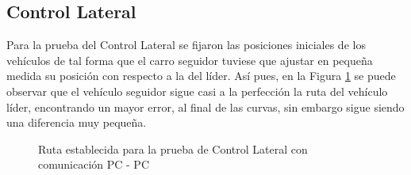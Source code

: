 \subsection{Control Lateral}
Para la prueba del Control Lateral se fijaron las posiciones iniciales de los vehículos de tal forma que el carro seguidor tuviese que ajustar en pequeña medida su posición con respecto a la del líder. Así pues, en la Figura \ref{fig:rutacl} se puede observar que el vehículo seguidor sigue casi a la perfección la ruta del vehículo líder, encontrando un mayor error, al final de las curvas, sin embargo sigue siendo una diferencia muy pequeña.  \\

\begin{figure}[H]
 \centering
 \caption{Ruta establecida para la prueba de Control Lateral con comunicación PC - PC}
 \label{fig:rutacl}
\end{figure}

